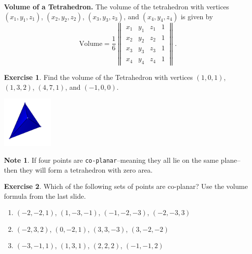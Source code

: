 \documentclass{beamer}
\newcommand{\fn}{\insertframenumber}
\theoremstyle{definition}
\newtheorem{exercise}{Exercise}
\newtheorem*{nb}{Note}
\renewcommand{\emph}[1]{{\color{blue}\texttt{#1}}}
\begin{document}
\begin{frame}{\fn}
	\begin{block}{\textbf{Volume of a Tetrahedron.}}
		The volume of the tetrahedron with vertices $(x_1,y_1,z_1)$, $(x_2,y_2,z_2)$, $(x_3,y_3,z_3)$, and $(x_4,y_4,z_4)$ is given by
			\[\text{Volume}=\frac{1}{6}\begin{Vmatrix}x_1&y_1&z_1&1\\x_2&y_2&z_2&1\\x_3&y_3&z_3&1\\x_4&y_4&z_4&1\end{Vmatrix}.\]
	\end{block}
	\begin{exercise}
		\begin{minipage}{.65\textwidth}Find the volume of the Tetrahedron with vertices $(1,0,1)$, $(1,3,2)$, $(4,7,1)$, and $(-1,0,0)$.\end{minipage}
		\begin{minipage}{.3\textwidth}
				\begin{center}
				\includegraphics[width=1in]{../images/tetrahedron}
			\end{center}
		\end{minipage}
	\end{exercise}
\end{frame}

\begin{frame}{\fn}
	\begin{nb}
		If four points are \emph{co-planar}--meaning they all lie on the same plane--then they will form a tetrahedron with zero area.  
	\end{nb}
	\begin{exercise} Which of the following sets of points are co-planar?  Use the volume formula from the last slide.
		\begin{enumerate}[label=(\alph*)]
			\item $(-2, -2, 1)$, $(1, -3, -1)$, $(-1, -2, -3)$, $(-2, -3, 3)$
			\item $(-2, 3, 2)$, $(0, -2, 1)$, $(3, 3, -3)$, $(3, -2, -2)$
			\item $(-3, -1, 1)$, $(1, 3, 1)$, $(2, 2, 2)$, $(-1, -1, 2)$
		\end{enumerate}
	\end{exercise}
\end{frame}
\end{document}
